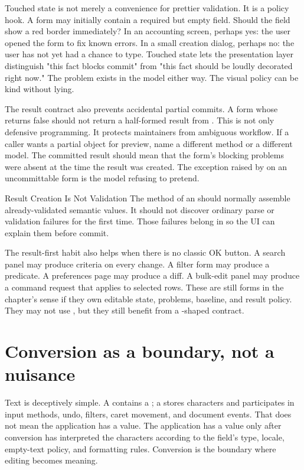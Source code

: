 Touched state is not merely a convenience for prettier validation. It is a
policy hook. A form may initially contain a required but empty field. Should
the field show a red border immediately? In an accounting screen, perhaps yes:
the user opened the form to fix known errors. In a small creation dialog,
perhaps no: the user has not yet had a chance to type. Touched state lets the
presentation layer distinguish "this fact blocks commit" from "this fact should
be loudly decorated right now." The problem exists in the model either way.
The visual policy can be kind without lying.

The result contract also prevents accidental partial commits. A form whose
 returns false should not return a half-formed result from
. This is not only defensive programming. It protects maintainers
from ambiguous workflow. If a caller wants a partial object for preview, name a
different method or a different model. The committed result should mean that
the form's blocking problems were absent at the time the result was created.
The exception raised by  on an uncommittable form is the model
refusing to pretend.

\begin{detailbox}{Result Creation Is Not Validation}
The  method of an  should normally
assemble already-validated semantic values. It should not discover ordinary
parse or validation failures for the first time. Those failures belong in
 so the UI can explain them before commit.
\end{detailbox}

The result-first habit also helps when there is no classic OK button. A search
panel may produce criteria on every change. A filter form may produce a
predicate. A preferences page may produce a diff. A bulk-edit panel may produce
a command request that applies to selected rows. These are still forms in the
chapter's sense if they own editable state, problems, baseline, and result
policy. They may not use , but they still benefit from a
-shaped contract.

\section{Conversion as a boundary, not a nuisance}

Text is deceptively simple. A  contains a ; a
 stores characters and participates in input methods, undo,
filters, caret movement, and document events. That does not mean the
application has a value. The application has a value only after conversion has
interpreted the characters according to the field's type, locale, empty-text
policy, and formatting rules. Conversion is the boundary where editing becomes
meaning.

